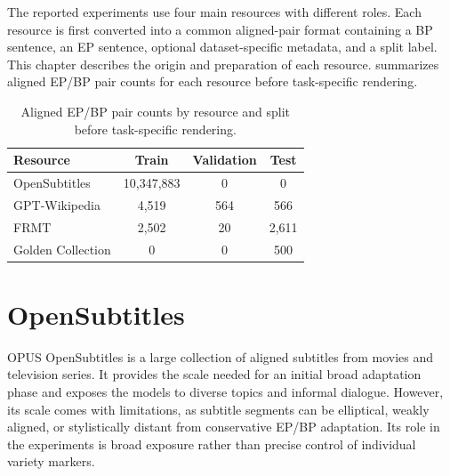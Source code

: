 \label{chap:data}
\label{sec:data}

The reported experiments use four main resources with different roles. Each
resource is first converted into a common aligned-pair format containing a BP
sentence, an EP sentence, optional dataset-specific metadata, and a split label.
This chapter describes the origin and preparation of each resource.
 summarizes aligned EP/BP pair counts for each resource
before task-specific rendering.

\begin{table}[H]
  \centering
  \thesistablefont
  \caption{Aligned EP/BP pair counts by resource and split before task-specific rendering.}
  \label{tab:data-resources}
\begin{tabular}{@{}lccc@{}}
    \toprule
    Resource & Train & Validation & Test \\
    \midrule
    OpenSubtitles & 10,347,883 & 0 & 0 \\
    GPT-Wikipedia & 4,519 & 564 & 566 \\
    FRMT & 2,502 & 20 & 2,611 \\
    Golden Collection & 0 & 0 & 500 \\
    \bottomrule
  \end{tabular}

\end{table}

\section{OpenSubtitles}
\label{sec:data-opensubtitles}

OPUS OpenSubtitles \citep{4992de1b5fb34f3e9691772606b36edf} is a large
collection of aligned subtitles from movies and television series. It provides
the scale needed for an initial broad adaptation phase and exposes the models
to diverse topics and informal dialogue. However, its scale comes with
limitations, as subtitle segments can be elliptical, weakly aligned, or
stylistically distant from conservative EP/BP adaptation. Its role in the
experiments is broad exposure rather than precise control of
individual variety markers.

